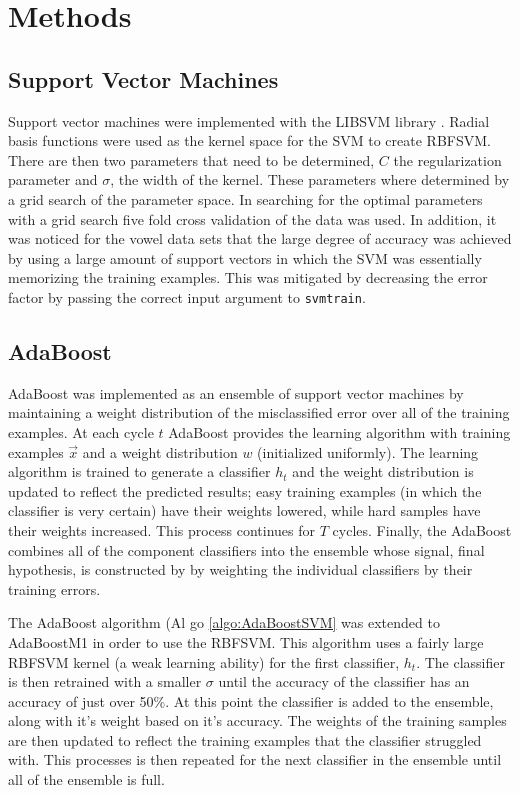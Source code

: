 \section{Methods}
\label{sec:Methods}

\subsection{Support Vector Machines}

Support vector machines were implemented with the LIBSVM library \cite{chang_libsvm:_2011}.
Radial basis functions were used as the kernel space for the SVM to create RBFSVM.
There are then two parameters that need to be determined, $C$ the regularization parameter and $\sigma$, the width of the kernel.
These parameters where determined by a grid search of the parameter space.
In searching for the optimal parameters with a grid search five fold cross validation of the data was used.
In addition, it was noticed for the vowel data sets that the large degree of accuracy was achieved by using a large amount of support vectors in which the SVM was essentially memorizing the training examples.
This was mitigated by decreasing the error factor by passing the correct input argument to \verb+svmtrain+.

\subsection{AdaBoost}

AdaBoost was implemented as an ensemble of support vector machines by maintaining a weight distribution of the misclassified error over all of the training examples.
At each cycle $t$ AdaBoost provides the learning algorithm with training examples $\vec{x}$ and a weight distribution $w$ (initialized uniformly).
The learning algorithm is trained to generate a classifier $h_t$ and the weight distribution is updated to reflect the predicted results; easy training examples (in which the classifier is very certain) have their weights lowered, while hard samples have their weights increased.
This process continues for $T$ cycles.
Finally, the AdaBoost combines all of the component classifiers into the ensemble whose signal, final hypothesis, is constructed by by weighting the individual classifiers by their training errors.

The AdaBoost algorithm (Al go \ref{algo:AdaBoostSVM} was extended to AdaBoostM1 in order to use the RBFSVM.
This algorithm uses a fairly large RBFSVM kernel (a weak learning ability) for the first classifier, $h_t$.
The classifier is then retrained with a smaller $\sigma$ until the accuracy of the classifier has an accuracy of just over 50\%.
At this point the classifier is added to the ensemble, along with it's weight based on it's accuracy.
The weights of the training samples are then updated to reflect the training examples that the classifier struggled with.
This processes is then repeated for the next classifier in the ensemble until all of the ensemble is full.

